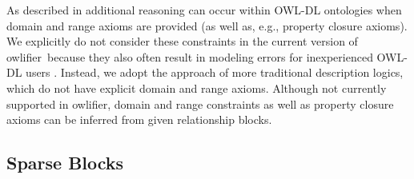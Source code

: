 \documentclass[5p,authoryear]{elsarticle}
\newcommand{\owlifier}{\textsf{owlifier}}
\begin{document}
As described in \cite{rector04:_owl_pizzas} additional reasoning can
occur within OWL-DL ontologies when domain and range axioms are
provided (as well as, e.g., property closure axioms).  We explicitly
do not consider these constraints in the current version of \owlifier\
because they also often result in modeling errors for inexperienced
OWL-DL users \cite{rector04:_owl_pizzas}. Instead, we adopt the
approach of more traditional description logics, which do not have
explicit domain and range axioms.  Although not currently supported in
\owlifier, domain and range constraints as well as property closure
axioms can be inferred from given relationship blocks.

\subsection{Sparse Blocks} 
\end{document}
